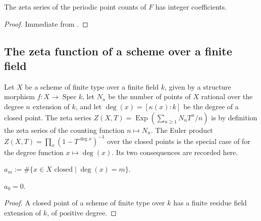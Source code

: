 \begin{corollary}
  \label{cor:weil-orbit-zeta-integral}
  \leanok

  The zeta series of the periodic point counts of $F$ has integer
  coefficients.
\end{corollary}

\begin{proof}
  \leanok
  Immediate from .
\end{proof}

\subsection{The zeta function of a scheme over a finite field}

Let $X$ be a scheme of finite type over a finite field $k$, given by a
structure morphism $f\colon X\to\operatorname{Spec}k$, let $N_n$ be the number
of points of $X$ rational over the degree $n$ extension of $k$, and let
$\deg(x)=[\kappa(x):k]$ be the degree of a closed point.  The zeta series
$Z(X,T)=\operatorname{Exp}(\sum_{n\ge1}N_nT^n/n)$ is by definition the zeta
series of the counting function $n\mapsto N_n$.  The Euler product
$Z(X,T)=\prod_x(1-T^{\deg x})^{-1}$ over the closed points is the special case
of  for the degree function
$x\mapsto\deg(x)$.  Its two consequences are recorded here.

\begin{definition}
  \label{def:weil-closed-point-count}
  \leanok

  $a_m:=\#\{x\in X\text{ closed}\mid\deg(x)=m\}$.
\end{definition}

\begin{lemma}
  \label{lemma:weil-closed-point-count-zero}
  \leanok

  $a_0=0$.
\end{lemma}

\begin{proof}
  \leanok
  A closed point of a scheme of finite type over $k$ has a finite residue field
  extension of $k$, of positive degree.
\end{proof}

